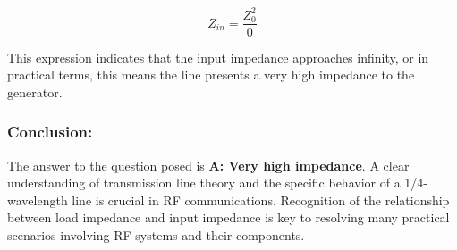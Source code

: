 \[
Z_{in} = \frac{Z_0^2}{0}
\]

This expression indicates that the input impedance approaches infinity, or in practical terms, this means the line presents a very high impedance to the generator.


\subsubsection*{Conclusion:}

The answer to the question posed is \textbf{A: Very high impedance}. A clear understanding of transmission line theory and the specific behavior of a 1/4-wavelength line is crucial in RF communications. Recognition of the relationship between load impedance and input impedance is key to resolving many practical scenarios involving RF systems and their components.
